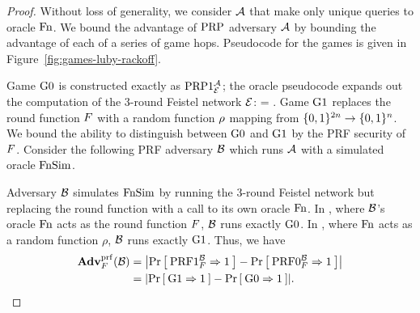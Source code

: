 \begin{proof}
Without loss of generality, we consider ${\mathcal A}$ that make only unique queries to oracle $\textnormal{Fn}$.
We bound the advantage of $\textnormal{PRP}$ adversary ${\mathcal A}$ by bounding the advantage of each of a series of game hops.
Pseudocode for the games is given in Figure~\ref{fig:games-luby-rackoff}.

Game ${{\textnormal G}}0$ is constructed exactly as $\textnormal{PRP}1^{{\mathcal A}}_{{\cal E}}$; the oracle pseudocode expands out the computation of the 3-round Feistel network ${\cal E}$:
\bnm
{} = .
\enm
Game ${{\textnormal G}}1$ replaces the round function $F$ with a random function $\rho$ mapping from $\{0,1\}^{2n}\rightarrow\{0,1\}^n$.
We bound the ability to distinguish between ${{\textnormal G}}0$ and ${{\textnormal G}}1$ by the PRF security of $F$.
Consider the following PRF adversary ${\mathcal B}$ which runs ${\mathcal A}$ with a simulated oracle $\textnormal{FnSim}$.

\begin{center}
\end{center}

Adversary ${\mathcal B}$ simulates $\textnormal{FnSim}$ by running the 3-round Feistel network but replacing the round function with a call to its own oracle $\textnormal{Fn}$.
In , where ${\mathcal B}$'s oracle $\textnormal{Fn}$ acts as the round function $F$, ${\mathcal B}$ runs exactly ${{\textnormal G}}0$.
In , where $\textnormal{Fn}$ acts as a random function $\rho$, ${\mathcal B}$ runs exactly ${{\textnormal G}}1$.
Thus, we have
\begin{align*}
\AdvPRF{\prf}{\advB} &= \absv*{\Prob{\PRF1_\prf^\advB\Rightarrow 1} - \Prob{\PRF0_\prf^\advB\Rightarrow1}}\\
&= \absv*{\Prob{\G1\Rightarrow 1} - \Prob{\G0\Rightarrow1}}.\\
\end{align*}


\end{proof}
